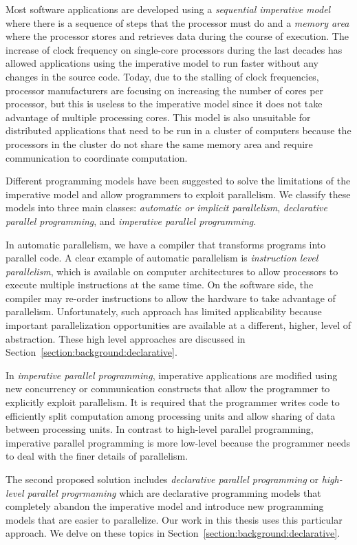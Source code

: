 Most software applications are developed using a \emph{sequential imperative
model} where there is a sequence of steps that the processor must do and a
\emph{memory area} where the processor stores and retrieves data during the
course of execution.  The increase of clock frequency on single-core processors
during the last decades has allowed applications using the imperative model to
run faster without any changes in the source code. Today, due to the stalling of
clock frequencies, processor manufacturers are focusing on increasing the number
of cores per processor, but this is useless to the imperative model since it
does not take advantage of multiple processing cores. This model is also
unsuitable for distributed applications that need to be run in a cluster of
computers because the processors in the cluster do not share the same memory
area and require communication to coordinate computation.

Different programming models have been suggested to solve the limitations of the
imperative model and allow programmers to exploit parallelism. We classify these
models into three main classes: \emph{automatic or implicit parallelism},
\emph{declarative parallel programming}, and \emph{imperative parallel
programming}.

In automatic parallelism, we have a compiler that transforms programs into
parallel code. A clear example of automatic parallelism is \emph{instruction
level parallelism}, which is available on computer architectures to allow
processors to execute multiple instructions at the same time. On the software
side, the compiler may re-order instructions to allow the hardware to take
advantage of parallelism. Unfortunately, such approach has limited applicability
because important parallelization opportunities are available at a different,
higher, level of abstraction. These high level approaches are discussed in
Section~\ref{section:background:declarative}.

In \emph{imperative parallel programming}, imperative applications are modified
using new concurrency or communication constructs that allow the programmer to
explicitly exploit parallelism. It is required that the programmer writes code
to efficiently split computation among processing units and allow sharing of
data between processing units. In contrast to high-level parallel programming,
imperative parallel programming is more low-level because the programmer needs
to deal with the finer details of parallelism.

The second proposed solution includes \emph{declarative parallel programming} or
\emph{high-level parallel progrmaming} which are declarative programming models
that completely abandon the imperative model and introduce new programming
models that are easier to parallelize. Our work in this thesis uses this
particular approach. We delve on these topics in
Section~\ref{section:background:declarative}.

